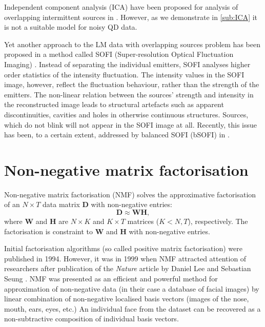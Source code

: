 Independent component analysis (ICA) have been proposed for analysis of overlapping intermittent sources in \cite{Lidke2005}. However, as we demonstrate in \autoref{sub:ICA} it is not a suitable model for noisy QD data. 

Yet another approach to the LM data with overlapping sources problem has been proposed in a method called SOFI (Super-resolution Optical Fluctuation Imaging) \cite{Dertinger2010b}. Instead of separating the individual emitters, SOFI analyses higher order statistics of the intensity fluctuation. The intensity values in the SOFI image, however, reflect the fluctuation behaviour, rather than the strength of the emitters. The non-linear relation between the sources' strength and intensity in the reconstructed image leads to structural artefacts such as apparent discontinuities, cavities and holes in otherwise continuous structures. Sources, which do not blink will not appear in the SOFI image at all. Recently, this issue has been, to a certain extent, addressed by balanced SOFI (bSOFI) in \cite{Geissbuehler2012}.


\clearpage
\section{Non-negative matrix factorisation\label{sec:NMF}}
Non-negative matrix factorisation (NMF) solves the approximative factorisation of an $N\times T$ data matrix $\bm{D}$ with non-negative entries:
%
\begin{equation}
	\bm{D}\approx\bm{WH},
	\label{eq:NMF approx}
\end{equation}
%
where $\bm{W}$ and $\bm{H}$ are $N\times K$ and $K\times T$  matrices ($K<N,T$), respectively. The factorisation is constraint to $\bm{W}$ and $\bm{H}$ with non-negative entries. 

Initial factorisation algorithms (so called positive matrix factorisation) \cite{Paatero1994} were published in 1994. However, it was in 1999 when NMF attracted attention of researchers after publication of the \emph{Nature} article by Daniel Lee and Sebastian Seung \cite{Lee1999}. NMF was presented as an efficient and powerful method for approximation of non-negative data (in their case a database of facial images) by linear combination of non-negative localised basis vectors (images of the nose, mouth, ears, eyes, etc.) An individual face from the dataset can be recovered as a non-subtractive composition of individual basis vectors. 

